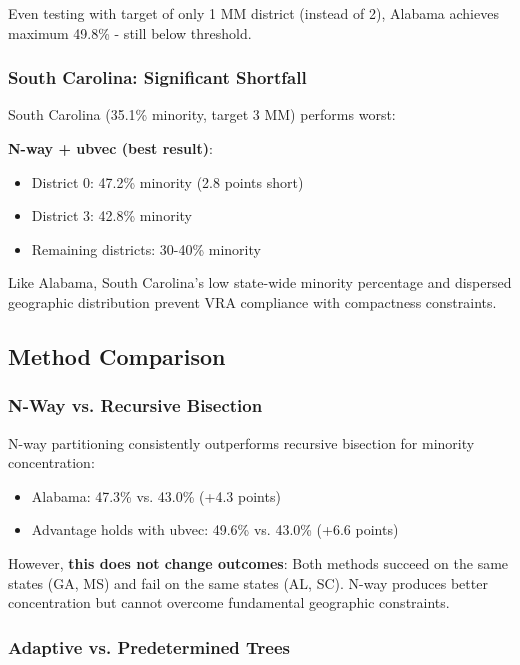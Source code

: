 Even testing with target of only 1 MM district (instead of 2), Alabama achieves maximum 49.8\% - still below threshold.

\subsubsection{South Carolina: Significant Shortfall}

South Carolina (35.1\% minority, target 3 MM) performs worst:

\textbf{N-way + ubvec (best result)}:
\begin{itemize}
\item District 0: 47.2\% minority (2.8 points short)
\item District 3: 42.8\% minority
\item Remaining districts: 30-40\% minority
\end{itemize}

Like Alabama, South Carolina's low state-wide minority percentage and dispersed geographic distribution prevent VRA compliance with compactness constraints.

\subsection{Method Comparison}

\subsubsection{N-Way vs. Recursive Bisection}

N-way partitioning consistently outperforms recursive bisection for minority concentration:

\begin{itemize}
\item Alabama: 47.3\% vs. 43.0\% (+4.3 points)
\item Advantage holds with ubvec: 49.6\% vs. 43.0\% (+6.6 points)
\end{itemize}

However, \textbf{this does not change outcomes}: Both methods succeed on the same states (GA, MS) and fail on the same states (AL, SC). N-way produces better concentration but cannot overcome fundamental geographic constraints.

\subsubsection{Adaptive vs. Predetermined Trees}

